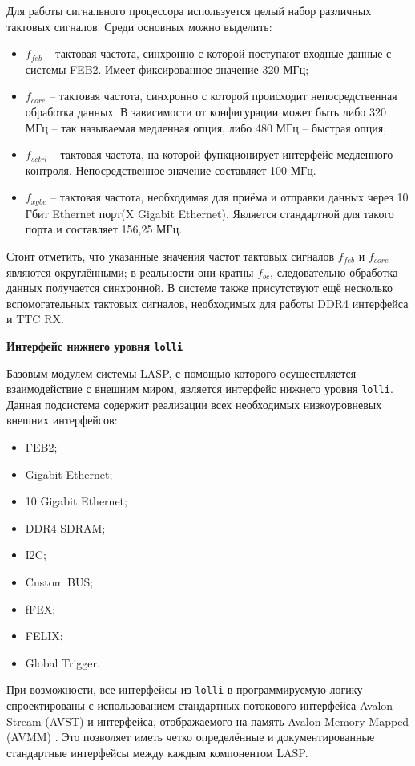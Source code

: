 Для работы сигнального процессора используется целый набор различных тактовых сигналов. Среди основных можно выделить:
\begin{itemize}
    \item $f_{feb}$ -- тактовая частота, синхронно с которой поступают входные данные с системы FEB2. Имеет фиксированное значение 320 МГц;
    \item $f_{core}$ --  тактовая частота, синхронно с которой происходит непосредственная обработка данных. В зависимости от конфигурации может быть либо 320 МГц -- так называемая медленная опция, либо 480 МГц -- быстрая опция;
    \item $f_{sctrl}$ -- тактовая частота, на которой функционирует интерфейс медленного контроля. Непосредственное значение составляет 100 МГц.
    \item $f_{xgbe}$ -- тактовая частота, необходимая для приёма и отправки данных через 10 Гбит Ethernet порт(X Gigabit Ethernet). Является стандартной для такого порта и составляет 156,25 МГц.
\end{itemize}\par
Стоит отметить, что указанные значения частот тактовых сигналов $f_{feb}$ и $f_{core}$ являются округлёнными; в реальности они кратны $f_{bc}$, следовательно обработка данных получается синхронной. В системе также присутствуют ещё несколько вспомогательных тактовых сигналов, необходимых для работы DDR4 интерфейса и TTC RX.\par
\textbf{Интерфейс нижнего уровня \texttt{lolli}}\par
Базовым модулем системы LASP, с помощью которого осуществляется взаимодействие с внешним миром, является интерфейс нижнего уровня \texttt{lolli}. Данная подсистема содержит реализации всех необходимых низкоуровневых внешних интерфейсов:\par
\begin{itemize}
    \item FEB2;
    \item Gigabit Ethernet;
    \item 10 Gigabit Ethernet;
    \item DDR4 SDRAM;
    \item I2C;
    \item Custom BUS;
    \item fFEX;
    \item FELIX;
    \item Global Trigger.
\end{itemize}\par
При возможности, все интерфейсы из \texttt{lolli} в программируемую логику спроектированы с использованием стандартных потокового интерфейса Avalon Stream (AVST) \parencite{avalon} и интерфейса, отображаемого на память Avalon Memory Mapped (AVMM) \parencite{avalon}. Это позволяет иметь четко определённые и документированные стандартные интерфейсы между каждым компонентом LASP.\par
